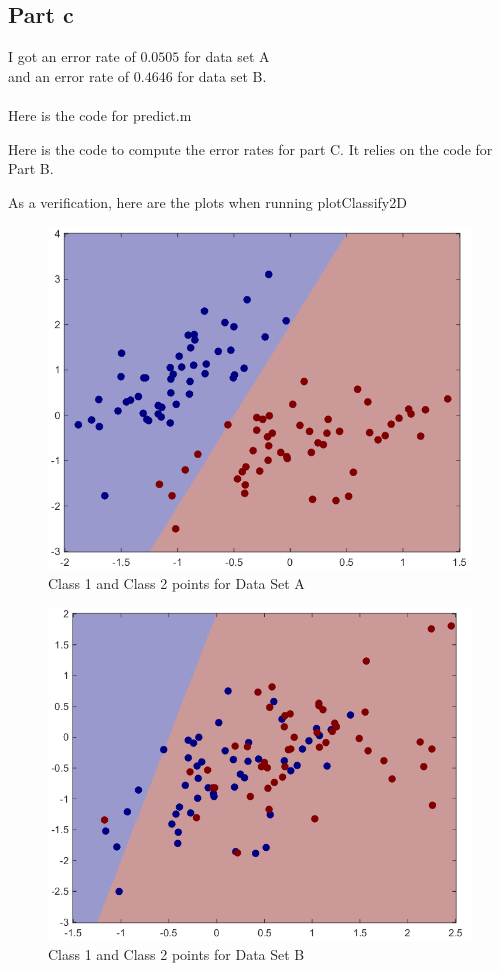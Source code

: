 \documentclass[twoside,11pt]{article}
\theoremstyle{definition}
\begin{document}
\subsection*{Part c}

I got an error rate of $0.0505$ for data set A\\
 and an error rate of $0.4646$ for data set B.\\
\\
Here is the code for predict.m

\newpage
Here is the code to compute the error rates for part C. It relies on the code for Part B.


As a verification, here are the plots when running plotClassify2D
\begin{figure}[h]
\centering
\includegraphics[width=4 in]{prob1cPlotA.png}
\caption{Class 1 and Class 2 points for Data Set A}
\end{figure}
\begin{figure}[h]
\centering
\includegraphics[width=4 in]{prob1cPlotB.png}
\caption{Class 1 and Class 2 points for Data Set B}
\end{figure}
\newpage
\end{document}
